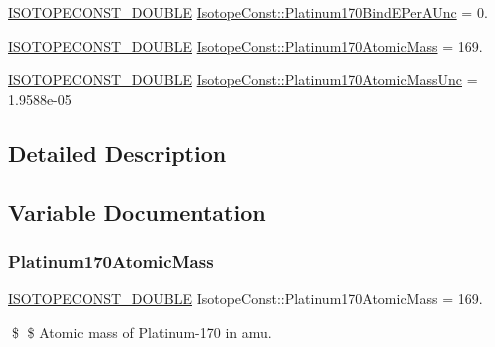 \begin{DoxyCompactItemize}
\mbox{\hyperlink{group___isotope_const-_macros_ga8f45a7272ce02c0b4c65c44636ed719a}{I\+S\+O\+T\+O\+P\+E\+C\+O\+N\+S\+T\+\_\+\+D\+O\+U\+B\+LE}} \mbox{\hyperlink{group___isotope_const-_platinum-_pt170_gacae5360556b108eb874c0745ab9c8e15}{Isotope\+Const\+::\+Platinum170\+Bind\+E\+Per\+A\+Unc}} = 0.
\item 
\mbox{\hyperlink{group___isotope_const-_macros_ga8f45a7272ce02c0b4c65c44636ed719a}{I\+S\+O\+T\+O\+P\+E\+C\+O\+N\+S\+T\+\_\+\+D\+O\+U\+B\+LE}} \mbox{\hyperlink{group___isotope_const-_platinum-_pt170_ga75caf83e0869b00c0d554c08942099da}{Isotope\+Const\+::\+Platinum170\+Atomic\+Mass}} = 169.
\item 
\mbox{\hyperlink{group___isotope_const-_macros_ga8f45a7272ce02c0b4c65c44636ed719a}{I\+S\+O\+T\+O\+P\+E\+C\+O\+N\+S\+T\+\_\+\+D\+O\+U\+B\+LE}} \mbox{\hyperlink{group___isotope_const-_platinum-_pt170_ga84c9f551e359a084561267ed85bf1e94}{Isotope\+Const\+::\+Platinum170\+Atomic\+Mass\+Unc}} = 1.\+9588e-\/05
\end{DoxyCompactItemize}


\subsection{Detailed Description}


\subsection{Variable Documentation}
\mbox{\label{group___isotope_const-_platinum-_pt170_ga75caf83e0869b00c0d554c08942099da}} 
\subsubsection{\texorpdfstring{Platinum170\+Atomic\+Mass}{Platinum170AtomicMass}}
{\footnotesize\ttfamily \mbox{\hyperlink{group___isotope_const-_macros_ga8f45a7272ce02c0b4c65c44636ed719a}{I\+S\+O\+T\+O\+P\+E\+C\+O\+N\+S\+T\+\_\+\+D\+O\+U\+B\+LE}} Isotope\+Const\+::\+Platinum170\+Atomic\+Mass = 169.}

\$ \$ Atomic mass of Platinum-\/170 in amu. \mbox{\label{group___isotope_const-_platinum-_pt170_ga84c9f551e359a084561267ed85bf1e94}} 
